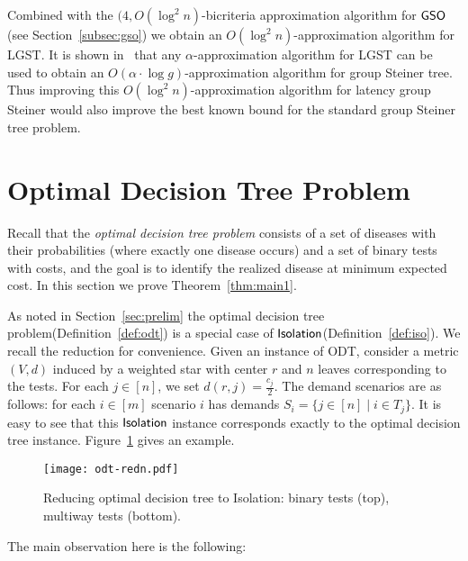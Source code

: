 \documentclass[11pt]{article}
\def\odt{{\sf ODT}\xspace}
\def\isoprob{\ensuremath{{\sf Isolation}}\xspace}
\def\gso{\ensuremath{{\sf GSO}}\xspace}
\def\lgs{{\sf LGST}\xspace}
\def\dtp{optimal decision tree problem\xspace}
\begin{document}
Combined with the $(4,O(\log^2 n)$-bicriteria approximation algorithm for \gso (see Section~\ref{subsec:gso}) we obtain an $O(\log^2n)$-approximation algorithm for \lgs.  It is  shown in~\cite{Vish-thesis} that any $\alpha$-approximation algorithm for \lgs can be used to obtain an $O(\alpha\cdot\log g)$-approximation algorithm for group Steiner tree. Thus improving this
$O(\log^2n)$-approximation algorithm for latency group Steiner would also improve the best known bound for the standard group
Steiner tree problem.







\section{Optimal Decision Tree Problem}
\label{sec:odt}

Recall that  the \emph{\dtp} consists of  a set of diseases with their probabilities (where exactly one disease occurs) 
and a set of binary tests with costs, and the goal is to identify the realized disease at minimum expected cost. In this section we prove Theorem~\ref{thm:main1}.


As noted in Section~\ref{sec:prelim} the \dtp (Definition~\ref{def:odt})  is a special
  case of \isoprob (Definition~\ref{def:iso}). We recall the reduction for convenience. Given an instance of \odt, consider a metric $(V,d)$ induced by a weighted star with
  center $r$ and $n$ leaves corresponding to the tests. For each $j\in
  [n]$, we set $d(r,j)=\frac{c_j}2$. The demand scenarios are as
  follows: for each $i\in [m]$ scenario $i$ has demands $S_i=\{j\in [n]\mid i\in T_j\}$.
  It is easy to see that this \isoprob instance corresponds
  exactly to the optimal decision tree instance. Figure~\ref{fig:odt-redn} gives an example.   



 
 
\begin{figure}[h]
\begin{center}
\texttt{[image: odt-redn.pdf]}
\end{center}
\caption{\label{fig:odt-redn} Reducing optimal decision tree to Isolation: binary tests (top), multiway tests
(bottom).}
\end{figure}



The main observation here is the following:  
\end{document}
